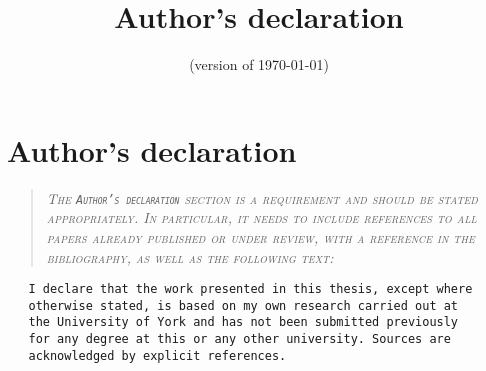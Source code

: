 \documentclass[../thesis]{subfiles}
\title{Author's declaration}
\date{(version of \today)} \author{}
\begin{document}

\chapter{Author's declaration}
\begin{quote}
\centering \scshape \slshape The \texttt{Author's declaration} section is a requirement and should be stated appropriately.
In particular, it needs to include references to all papers already published or under review, with a reference in the bibliography, as well as the following text:
\end{quote}
\bigskip
\begin{verbatim}
   I declare that the work presented in this thesis, except where
   otherwise stated, is based on my own research carried out at
   the University of York and has not been submitted previously
   for any degree at this or any other university. Sources are
   acknowledged by explicit references.
\end{verbatim}


\ifSubfilesClassLoaded{ 
  \printbibliography[heading=bibintoc, title=References]
  }{}
\end{document}
